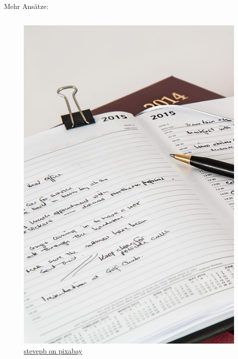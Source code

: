 \begin{frame}{Mehr Ansätze:}
    \begin{columns}[t]
        \begin{column}{0.3\textwidth}
            \begin{figure}
                \begin{flushleft}
                    \includegraphics[width=\textwidth]{graphics/diary-614149_960_720.jpg}
                    \caption*{\href{https://pixabay.com/de/photos/tagebuch-stift-notizbuch-januar-614149/}{stevepb on pixabay}}    
                \end{flushleft}                
            \end{figure}
            

\end{column}
\end{columns}
\end{frame}
